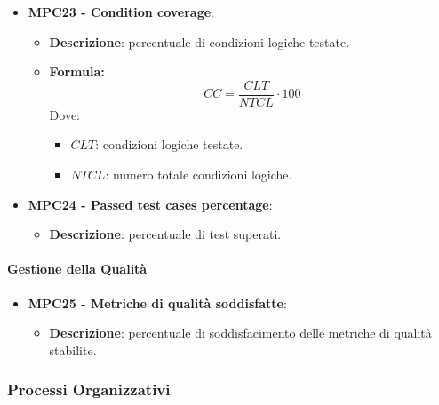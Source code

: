 \documentclass[10pt]{article}
\begin{document}
\begin{justify}
\begin{itemize}
    \item \textbf{MPC23 - Condition coverage}:
    \begin{itemize}
        \item   \textbf{Descrizione}: percentuale di condizioni logiche testate.
        \item   \textbf{Formula:}
            \[
            CC = \frac{CLT}{NTCL} \cdot 100
            \]
            Dove:
            \begin{itemize}
                \item $CLT$: condizioni logiche testate.
                \item $NTCL$: numero totale condizioni logiche.
            \end{itemize}
    \end{itemize}
    \item \textbf{MPC24 - Passed test cases percentage}:
        \begin{itemize}
            \item \textbf{Descrizione}: percentuale di test superati.
        \end{itemize}
\end{itemize}

\paragraph{Gestione della Qualità}
\begin{itemize}
 \item \textbf{MPC25 - Metriche di qualità soddisfatte}:
    \begin{itemize}
        \item \textbf{Descrizione}: percentuale di soddisfacimento delle metriche di qualità stabilite.
    \end{itemize}
\end{itemize}

\subsubsection{Processi Organizzativi}

\end{justify}
\end{document}
